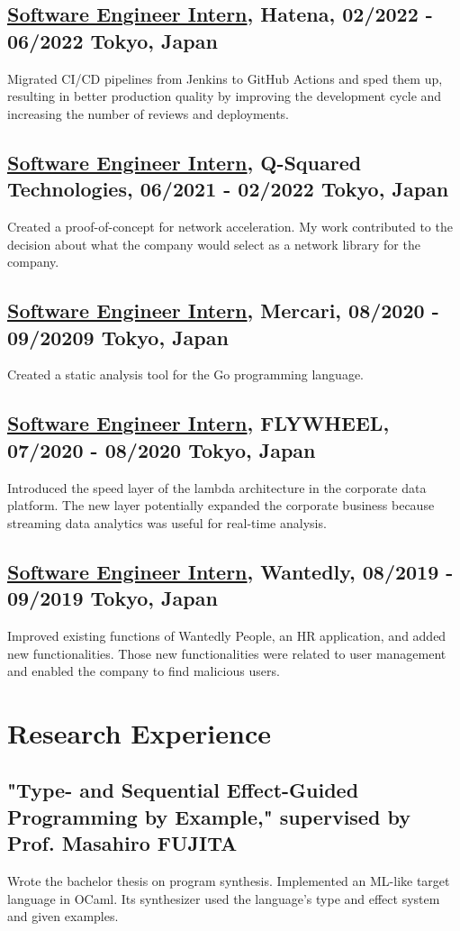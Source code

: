 \documentclass[10pt]{article}
\begin{document}
  \subsection*{\underline{Software Engineer Intern}, Hatena, 02/2022 - 06/2022 \hfill Tokyo, Japan}
    Migrated CI/CD pipelines from Jenkins to GitHub Actions and sped them up, resulting in better production quality by improving the development cycle and increasing the number of reviews and deployments.
  \subsection*{\underline{Software Engineer Intern}, Q-Squared Technologies, 06/2021 - 02/2022 \hfill Tokyo, Japan}
    Created a proof-of-concept for network acceleration.
    My work contributed to the decision about what the company would select as a network library for the company.
  \subsection*{\underline{Software Engineer Intern}, Mercari, 08/2020 - 09/20209 \hfill Tokyo, Japan}
    Created a static analysis tool for the Go programming language.
  \subsection*{\underline{Software Engineer Intern}, FLYWHEEL, 07/2020 - 08/2020 \hfill Tokyo, Japan}
    Introduced the speed layer of the lambda architecture in the corporate data platform.
    The new layer potentially expanded the corporate business because streaming data analytics was useful for real-time analysis.
  \subsection*{\underline{Software Engineer Intern}, Wantedly, 08/2019 - 09/2019 \hfill Tokyo, Japan}
    Improved existing functions of Wantedly People, an HR application, and added new functionalities.
    Those new functionalities were related to user management and enabled the company to find malicious users.

\section*{Research Experience}
  \subsection*{"Type- and Sequential Effect-Guided Programming by Example," supervised by Prof. Masahiro FUJITA}
    Wrote the bachelor thesis on program synthesis.
    Implemented an ML-like target language in OCaml.
    Its synthesizer used the language's type and effect system and given examples.
\end{document}
